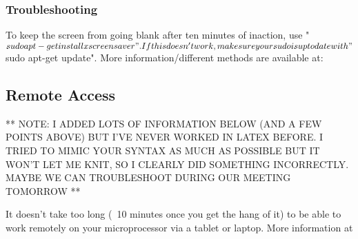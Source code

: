 \documentclass{article}\usepackage[]{graphicx}\usepackage[]{color}
\begin{document}
\subsubsection{Troubleshooting}


To keep the screen from going blank after ten minutes of inaction, use "$sudo apt-get install xscreensaver".  If this doesn't work, make sure your sudo is up to date with "$sudo apt-get update".  More information/different methods are available at: %

\subsection{Remote Access}

** NOTE: I ADDED LOTS OF INFORMATION BELOW (AND A FEW POINTS ABOVE) BUT I'VE NEVER WORKED IN LATEX BEFORE.  I TRIED TO MIMIC YOUR SYNTAX AS MUCH AS POSSIBLE BUT IT WON'T LET ME KNIT, SO I CLEARLY DID SOMETHING INCORRECTLY.  MAYBE WE CAN TROUBLESHOOT DURING OUR MEETING TOMORROW **

It doesn't take too long (~10 minutes once you get the hang of it) to be able to work remotely on your microprocessor via a tablet or laptop.  More information at %
\end{document}
